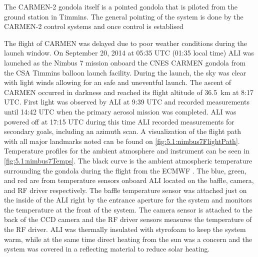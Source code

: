 The CARMEN-2 gondola itself is a pointed gondola that is piloted from the ground station in Timmins. The general pointing of the system is done by the CARMEN-2 control systems and once control is establised 



The flight of CARMEN was delayed due to poor weather conditions during the launch window. On September 20, 2014 at 05:35 UTC (01:35 local time) ALI was launched as the Nimbus 7 mission onboard the CNES CARMEN gondola from the CSA Timmins balloon launch facility. During the launch, the sky was clear with light winds allowing for an safe and uneventful launch. The ascent of CARMEN occurred in darkness and reached its flight altitude of 36.5~km at 8:17 UTC. First light was observed by ALI at 9:39 UTC and recorded measurements until 14:42 UTC when the primary aerosol mission was completed. ALI was powered off at 17:15 UTC during this time ALI recorded measurements for secondary goals, including an azimuth scan. A visualization of the flight path with all major landmarks noted can be found on \autoref{fig:5.1:nimbus7FlightPath}. Temperature profiles for the ambient atmosphere and instrument can be seen in \autoref{fig:5.1:nimbus7Temps}. The black curve is the ambient atmospheric temperature surrounding the gondola during the flight from the ECMWF \citep{Molteni1996}. The blue, green, and red are from temperature sensors onboard ALI located on the baffle, camera, and RF driver respectively. The baffle temperature sensor was attached just on the inside of the ALI right by the entrance aperture for the system and monitors the temperature at the front of the system. The camera sensor is attached to the back of the CCD camera and the RF driver sensors measures the temperature of the RF driver. ALI was thermally insulated with styrofoam to keep the system warm, while at the same time direct heating from the sun was a concern and the system was covered in a reflecting material to reduce solar heating.


